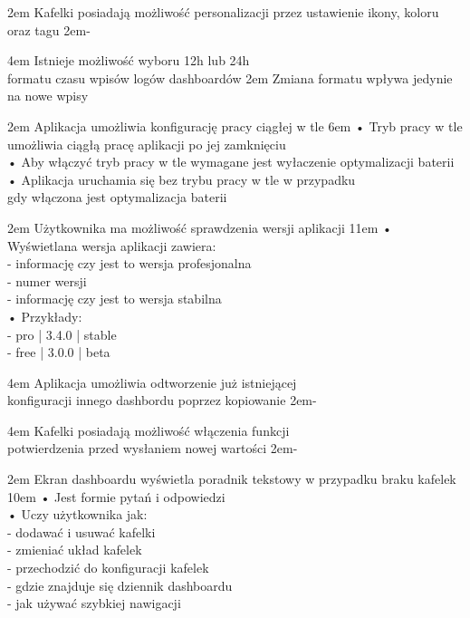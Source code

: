 {2em}{
    Kafelki posiadają możliwość personalizacji przez ustawienie ikony, koloru oraz tagu
}
{2em}{-}

{4em}{
    Istnieje możliwość wyboru 12h lub 24h\\
    formatu czasu wpisów logów dashboardów
}
{2em}{
    Zmiana formatu wpływa jedynie na nowe wpisy
}

{2em}{
    Aplikacja umożliwia konfigurację pracy ciągłej w tle
}
{6em}{
    • Tryb pracy w tle umożliwia ciągłą pracę aplikacji po jej zamknięciu\\
    • Aby włączyć tryb pracy w tle wymagane jest wyłaczenie optymalizacji baterii\\
    • Aplikacja uruchamia się bez trybu pracy w tle w przypadku\\
    \hspace*{0.5em} gdy włączona jest optymalizacja baterii
}

{2em}{
    Użytkownika ma możliwość sprawdzenia wersji aplikacji
}
{11em}{
    • Wyświetlana wersja aplikacji zawiera:\\
    - informację czy jest to wersja profesjonalna\\
    - numer wersji\\
    - informację czy jest to wersja stabilna\\

    • Przykłady:\\
    - pro | 3.4.0 | stable\\
    - free | 3.0.0 | beta
}

{4em}{
    Aplikacja umożliwia odtworzenie już istniejącej\\
    konfiguracji innego dashbordu poprzez kopiowanie
}
{2em}{-}

{4em}{
    Kafelki posiadają możliwość włączenia funkcji\\
    potwierdzenia przed wysłaniem nowej wartości
}
{2em}{-}

{2em}{
    Ekran dashboardu wyświetla poradnik tekstowy w przypadku braku kafelek
}
{10em}{
    • Jest formie pytań i odpowiedzi\\
    • Uczy użytkownika jak:\\
    - dodawać i usuwać kafelki\\
    - zmieniać układ kafelek\\
    - przechodzić do konfiguracji kafelek\\
    - gdzie znajduje się dziennik dashboardu\\
    - jak używać szybkiej nawigacji
}

